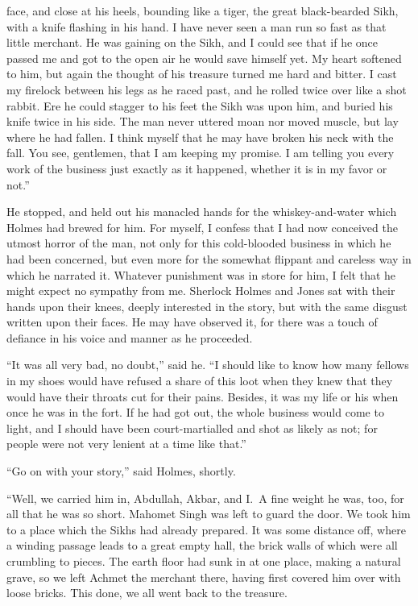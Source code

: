 \documentclass[12pt,english,oneside]{book}
\begin{document}
face, and close at his heels, bounding like a tiger, the great black-bearded
Sikh, with a knife flashing in his hand. I have never seen a man run
so fast as that little merchant. He was gaining on the Sikh, and I
could see that if he once passed me and got to the open air he would
save himself yet. My heart softened to him, but again the thought
of his treasure turned me hard and bitter. I cast my firelock between
his legs as he raced past, and he rolled twice over like a shot rabbit.
Ere he could stagger to his feet the Sikh was upon him, and buried
his knife twice in his side. The man never uttered moan nor moved
muscle, but lay where he had fallen. I think myself that he may have
broken his neck with the fall. You see, gentlemen, that I am keeping
my promise. I am telling you every work of the business just exactly
as it happened, whether it is in my favor or not.''

He stopped, and held out his manacled hands for the whiskey-and-water
which Holmes had brewed for him. For myself, I confess that I had
now conceived the utmost horror of the man, not only for this cold-blooded
business in which he had been concerned, but even more for the somewhat
flippant and careless way in which he narrated it. Whatever punishment
was in store for him, I felt that he might expect no sympathy from
me. Sherlock Holmes and Jones sat with their hands upon their knees,
deeply interested in the story, but with the same disgust written
upon their faces. He may have observed it, for there was a touch of
defiance in his voice and manner as he proceeded.

{}``It was all very bad, no doubt,'' said he. {}``I should like
to know how many fellows in my shoes would have refused a share of
this loot when they knew that they would have their throats cut for
their pains. Besides, it was my life or his when once he was in the
fort. If he had got out, the whole business would come to light, and
I should have been court-martialled and shot as likely as not; for
people were not very lenient at a time like that.''

{}``Go on with your story,'' said Holmes, shortly.

{}``Well, we carried him in, Abdullah, Akbar, and I.\  A fine weight
he was, too, for all that he was so short. Mahomet Singh was left
to guard the door. We took him to a place which the Sikhs had already
prepared. It was some distance off, where a winding passage leads
to a great empty hall, the brick walls of which were all crumbling
to pieces. The earth floor had sunk in at one place, making a natural
grave, so we left Achmet the merchant there, having first covered
him over with loose bricks. This done, we all went back to the treasure.
\end{document}
